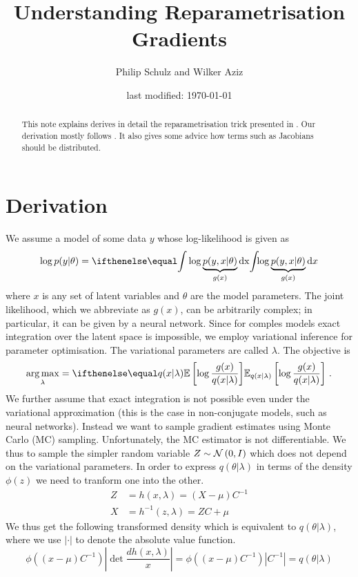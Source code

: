 \documentclass[a4paper,11pt]{article}
\author{Philip Schulz and Wilker Aziz}
\title{Understanding Reparametrisation Gradients}
\date{last modified: \today}
\begin{document}
\maketitle

\begin{abstract}
This note explains derives in detail the reparametrisation trick presented in \cite{KingmaWelling:2013,RezendeEtAl:2014,TitsiasLazarogredilla:2014}. Our derivation mostly follows \cite{TitsiasLazarogredilla:2014}. It also gives some advice how terms such as Jacobians should be distributed.
\end{abstract}

\section{Derivation}

We assume a model of some data $ y $ whose log-likelihood is given as
\begin{equation}
\log p(y|\theta) = \intl { \log \underbrace{p(y,x|\theta)}_{g(x)} } {x} 
\end{equation}
where $ x $ is any set of latent variables and $ \theta $ are the model parameters. The joint likelihood, which we abbreviate as $ g(x) $, can be arbitrarily
complex; in particular, it can be given by a neural network. Since for comples models exact integration over the latent space is impossible, we employ variational
inference for parameter optimisation. The variational parameters are called $ \lambda $. The objective is
\begin{equation} \label{eq:objective}
\underset{\lambda}{\arg \max} = \E[q(x|\lambda)]{\log \dfrac{g(x)}{q(x|\lambda)}} \ .
\end{equation}
We further assume that exact integration is not possible even under the variational approximation (this is the case in non-conjugate models, such as neural networks). Instead we want to sample gradient estimates using Monte Carlo (MC) sampling. Unfortunately, the MC estimator is not differentiable. We thus to sample the simpler
random variable $ Z \sim \mathcal{N}\left(0,I\right) $ which does not depend on the variational parameters. In order to express $ q(\theta|\lambda) $ in terms of the density 
$ \phi(z) $ we need to tranform one into the other.
\begin{align}
Z &= h(x, \lambda) = (X - \mu) C^{-1} \\
X &= h^{-1}(z, \lambda) = ZC + \mu
\end{align}
We thus get the following transformed density which is equivalent to $ q(\theta|\lambda) $, where we use $ |\cdot| $ to denote the absolute value function.
\begin{equation}
\phi((x - \mu) C^{-1})|\det\frac{dh(x, \lambda)}{x}| = \phi((x - \mu) C^{-1})|C^{-1}| =  q(\theta|\lambda)
\end{equation}
\end{document}
